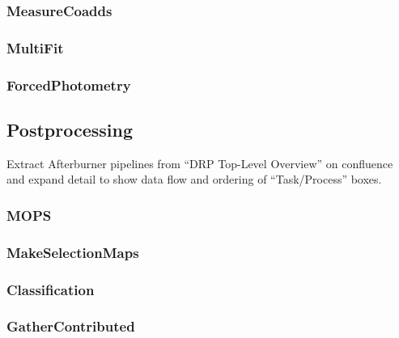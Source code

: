 \subsubsection{MeasureCoadds}
\label{sec:drpMeasureCoadds}
\subsubsection{MultiFit}
\label{sec:drpMultiFit}
\subsubsection{ForcedPhotometry}
\label{sec:drpForcedPhotometry}

\subsection{Postprocessing}
\label{sec:drp_postprocessing}

\begin{note}
Extract Afterburner pipelines from ``DRP Top-Level Overview'' on confluence and expand detail to show data flow and ordering of ``Task/Process'' boxes.
\end{note}

\subsubsection{MOPS}
\label{sec:drpMOPS}
\subsubsection{MakeSelectionMaps}
\label{sec:drpMakeSelectionMaps}
\subsubsection{Classification}
\label{sec:drpClassification}
\subsubsection{GatherContributed}
\label{sec:drpGatherContributed}
